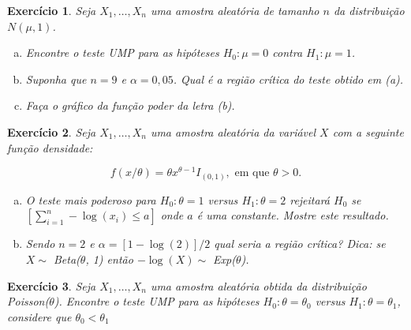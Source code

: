 \documentclass[letter,11pt]{article}
\newtheorem{exer}{Exercício}
\begin{document}
\begin{exer} \rm Seja $X_1, \ldots, X_n$ uma amostra aleatória de tamanho $n$ da distribuição $N(\mu, 1)$.
\begin{enumerate}[a)]
\item Encontre o teste UMP para as hipóteses $H_0: \mu=0$ contra $H_1: \mu=1$.

\item Suponha que $n=9$ e $\alpha=0,05$. Qual é a região crítica do teste obtido em (a).

\item Faça o gráfico da função poder da letra (b).
\end{enumerate}
\end{exer}


\begin{exer} \rm Seja $X_1, \ldots, X_n$ uma amostra aleatória da variável $X$ com a seguinte função densidade:

$$
f(x/\theta)=\theta x^{\theta-1} I_{(0,1)}, \mbox{ em que } \theta>0.
$$

\begin{enumerate}[a)]
\item O teste mais poderoso para $H_0: \theta=1$ versus $H_1: \theta=2$ rejeitará $H_0$ se $[\sum_{i=1}^n -\log (x_i) \leq a]$ onde $a$ é uma constante. Mostre este resultado.

\item Sendo $n=2$ e $\alpha=[1-\log(2)]/2$ qual seria a região crítica? Dica: se $X \sim$ Beta($\theta$, 1) então $-\log(X)\sim$ Exp($\theta$).
\end{enumerate}
\end{exer}


\begin{exer} \rm Seja $X_1, \ldots, X_n$ uma amostra aleatória obtida da distribuição Poisson($\theta$). Encontre o teste UMP para as hipóteses $H_0: \theta=\theta_0$ versus $H_1: \theta=\theta_1$, considere que $\theta_0 < \theta_1$
\end{exer}
\end{document}
